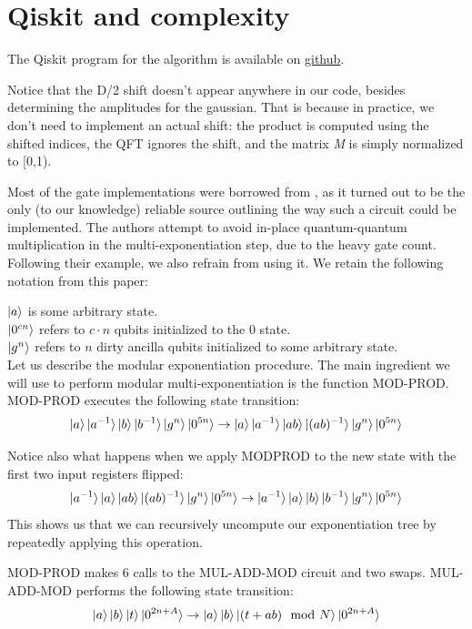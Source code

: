\chapter{Qiskit and complexity}

The Qiskit program for the algorithm is available on \href{https://github.com/motogp-bit/regev-thesis}{github}.

Notice that the D/2 shift doesn't appear anywhere in our code, besides determining the amplitudes for the gaussian. That is because in practice, we don't need to implement an actual shift: the product is computed using the shifted indices, the QFT ignores the shift, and the matrix \textit{M} is simply normalized to [0,1).

Most of the gate implementations were borrowed from \cite{RagavanVaikuntanathan2023}, as it turned out to be the only (to our knowledge) reliable source outlining the way such a circuit could be implemented. The authors attempt to avoid in-place quantum-quantum multiplication in the multi-exponentiation step, due to the heavy gate count. Following their example, we also refrain from using it. We retain the following notation from this paper: 

$\ket{a}$ is some arbitrary state.\\
$\ket{0^{cn}}$ refers to $c \cdot n$ qubits initialized to the 0 state.\\
$\ket{g^n}$ refers to $n$ dirty ancilla qubits initialized to some arbitrary state.\\ 


Let us describe the modular exponentiation procedure. The main ingredient we will use to perform modular multi-exponentiation is the function MOD-PROD.\\
MOD-PROD executes the following state transition:
\begin{equation}
    \ket{a} \ket{a^{-1}} \ket{b} \ket{b^{-1}} \ket{g^n} \ket{0^{5n}} \to \ket{a} \ket{a^{-1} } \ket{ab} \ket{(ab)^{-1}} \ket{g^n} \ket{0^{5n}}
\end{equation}

Notice also what happens when we apply MODPROD to the new state with the first two input registers flipped: $$\ket{a^{-1}} \ket{a} \ket{ab} \ket{(ab)^{-1}} \ket{g^n} \ket{0^{5n}} \to \ket{a^{-1}} \ket{a}  \ket{b} \ket{b^{-1}} \ket{g^n} \ket{0^{5n}}$$ This shows us that we can recursively uncompute our exponentiation tree by repeatedly applying this operation. 

MOD-PROD makes 6 calls to the MUL-ADD-MOD circuit and two swaps. MUL-ADD-MOD performs the following state transition:
\begin{equation}
    \ket{a}  \ket{b}  \ket{t} \ket{0^{2n + A}} \to \ket{a}  \ket{b}  \ket{(t+ab) \mod N} \ket{0^{2n + A}}
    \label{eq13.2}
\end{equation}

